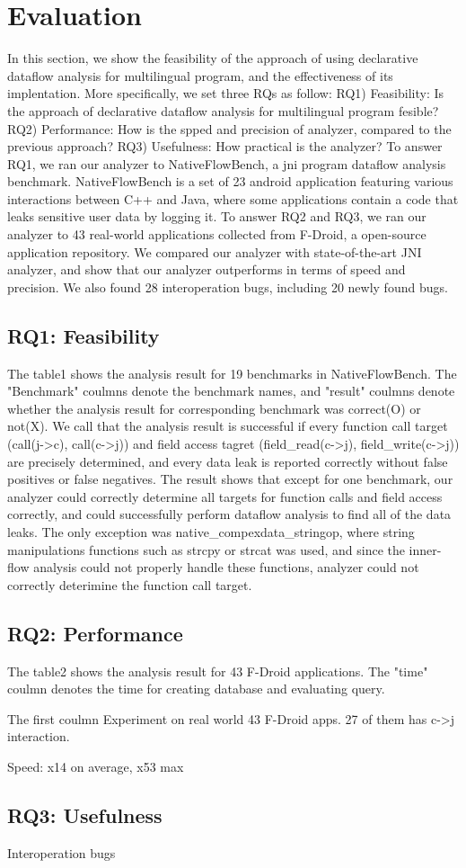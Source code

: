 \section{Evaluation}
In this section, we show the feasibility of the approach of using declarative dataflow
analysis for multilingual program, and the effectiveness of its implentation. More specifically,
we set three RQs as follow:
RQ1) Feasibility: Is the approach of declarative dataflow analysis for multilingual program fesible?
RQ2) Performance: How is the spped and precision of analyzer, compared to the previous approach?
RQ3) Usefulness: How practical is the analyzer?
To answer RQ1, we ran our analyzer to NativeFlowBench, a jni program dataflow analysis benchmark.
NativeFlowBench is a set of 23 android application featuring various interactions between
C++ and Java, where some applications contain a code that leaks sensitive user data by logging it.
To answer RQ2 and RQ3, we ran our analyzer to 43 real-world applications collected from F-Droid, a
open-source application repository. We compared our analyzer with state-of-the-art JNI analyzer, and
show that our analyzer outperforms in terms of speed and precision. We also found 28 interoperation bugs,
including 20 newly found bugs.


\subsection{RQ1: Feasibility}
The table1 shows the analysis result for 19 benchmarks in NativeFlowBench.
The "Benchmark" coulmns denote the benchmark names, and "result" coulmns denote whether the
analysis result for corresponding benchmark was correct(O) or not(X). We call that the
analysis result is successful if every function call target (call(j->c), call(c->j)) and field access tagret
(field_read(c->j), field_write(c->j)) are precisely determined, and every data leak is reported correctly
without false positives or false negatives.
The result shows that except for one benchmark, our analyzer could correctly determine all targets for
function calls and field access correctly, and could successfully perform dataflow analysis to find all
of the data leaks. The only exception was native_compexdata_stringop, where string manipulations functions
such as strcpy or strcat was used, and since the inner-flow analysis could not properly handle these functions,
analyzer could not correctly deterimine the function call target.

\subsection{RQ2: Performance}
The table2 shows the analysis result for 43 F-Droid applications. The "time" coulmn denotes
the time for creating database and evaluating query. 


The first coulmn 
Experiment on real world 43 F-Droid apps.
27 of them has c->j interaction.

Speed: x14 on average, x53 max

\subsection{RQ3: Usefulness}
Interoperation bugs

